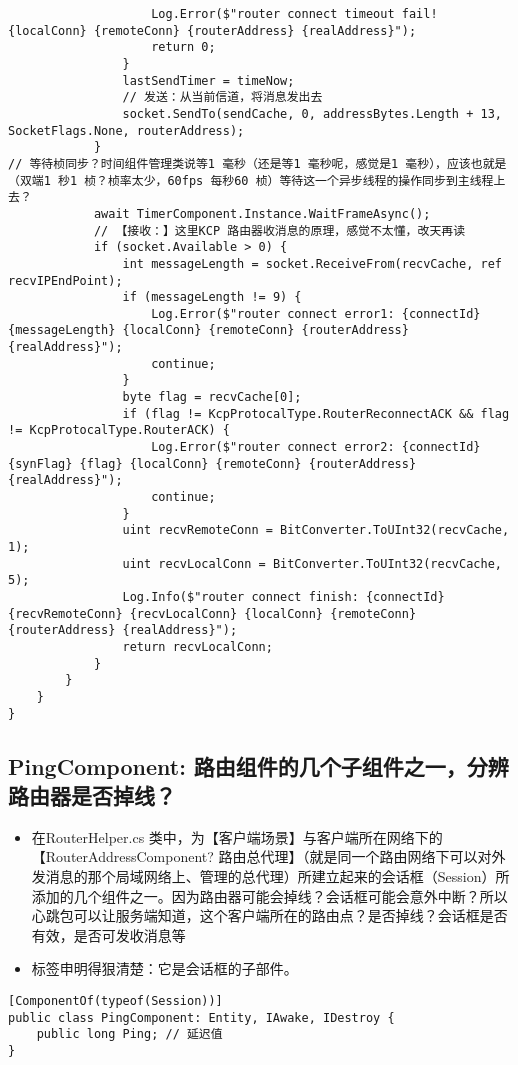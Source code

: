 \documentclass[9pt, b5paper]{article}
\begin{document}
\begin{verbatim}
                    Log.Error($"router connect timeout fail! {localConn} {remoteConn} {routerAddress} {realAddress}");
                    return 0;
                }
                lastSendTimer = timeNow;
                // 发送：从当前信道，将消息发出去
                socket.SendTo(sendCache, 0, addressBytes.Length + 13, SocketFlags.None, routerAddress);
            }
// 等待桢同步？时间组件管理类说等1 毫秒（还是等1 毫秒呢，感觉是1 毫秒），应该也就是（双端1 秒1 桢？桢率太少，60fps 每秒60 桢）等待这一个异步线程的操作同步到主线程上去？
            await TimerComponent.Instance.WaitFrameAsync(); 
            // 【接收：】这里KCP 路由器收消息的原理，感觉不太懂，改天再读
            if (socket.Available > 0) {
                int messageLength = socket.ReceiveFrom(recvCache, ref recvIPEndPoint);
                if (messageLength != 9) {
                    Log.Error($"router connect error1: {connectId} {messageLength} {localConn} {remoteConn} {routerAddress} {realAddress}");
                    continue;
                }
                byte flag = recvCache[0];
                if (flag != KcpProtocalType.RouterReconnectACK && flag != KcpProtocalType.RouterACK) {
                    Log.Error($"router connect error2: {connectId} {synFlag} {flag} {localConn} {remoteConn} {routerAddress} {realAddress}");
                    continue;
                }
                uint recvRemoteConn = BitConverter.ToUInt32(recvCache, 1);
                uint recvLocalConn = BitConverter.ToUInt32(recvCache, 5);
                Log.Info($"router connect finish: {connectId} {recvRemoteConn} {recvLocalConn} {localConn} {remoteConn} {routerAddress} {realAddress}");
                return recvLocalConn;
            }
        }
    }
}
\end{verbatim}
\subsection{PingComponent: 路由组件的几个子组件之一，分辨路由器是否掉线？}
\label{sec-7-6}
\begin{itemize}
\item 在RouterHelper.cs 类中，为【客户端场景】与客户端所在网络下的【RouterAddressComponent? 路由总代理】（就是同一个路由网络下可以对外发消息的那个局域网络上、管理的总代理）所建立起来的会话框（Session）所添加的几个组件之一。因为路由器可能会掉线？会话框可能会意外中断？所以心跳包可以让服务端知道，这个客户端所在的路由点？是否掉线？会话框是否有效，是否可发收消息等
\item 标签申明得狠清楚：它是会话框的子部件。
\end{itemize}
\begin{verbatim}
[ComponentOf(typeof(Session))]
public class PingComponent: Entity, IAwake, IDestroy {
    public long Ping; // 延迟值
}
\end{verbatim}
\end{document}
